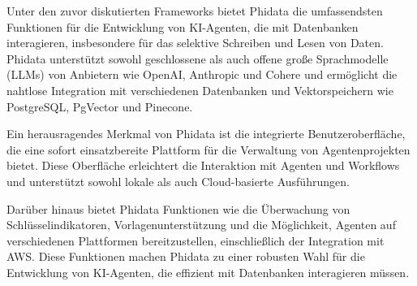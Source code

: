 Unter den zuvor diskutierten Frameworks bietet Phidata die umfassendsten Funktionen für die Entwicklung von KI-Agenten, die mit Datenbanken interagieren, insbesondere für das selektive Schreiben und Lesen von Daten. Phidata unterstützt sowohl geschlossene als auch offene große Sprachmodelle (LLMs) von Anbietern wie OpenAI, Anthropic und Cohere und ermöglicht die nahtlose Integration mit verschiedenen Datenbanken und Vektorspeichern wie PostgreSQL, PgVector und Pinecone.\cite{aisharenet-kitools}

Ein herausragendes Merkmal von Phidata ist die integrierte Benutzeroberfläche, die eine sofort einsatzbereite Plattform für die Verwaltung von Agentenprojekten bietet. Diese Oberfläche erleichtert die Interaktion mit Agenten und Workflows und unterstützt sowohl lokale als auch Cloud-basierte Ausführungen.\cite{aisharenet-kitools}

Darüber hinaus bietet Phidata Funktionen wie die Überwachung von Schlüsselindikatoren, Vorlagenunterstützung und die Möglichkeit, Agenten auf verschiedenen Plattformen bereitzustellen, einschließlich der Integration mit AWS. Diese Funktionen machen Phidata zu einer robusten Wahl für die Entwicklung von KI-Agenten, die effizient mit Datenbanken interagieren müssen.\cite{aisharenet-kitools}